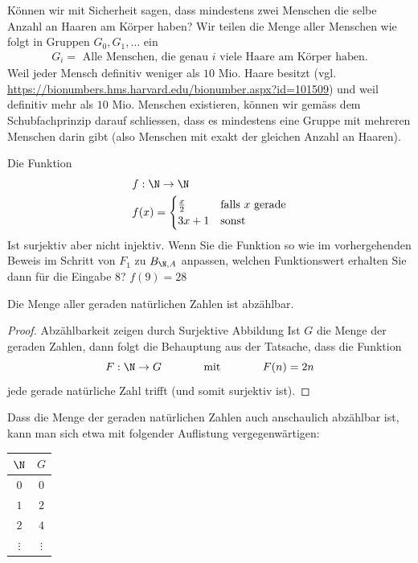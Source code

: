\begin{example}
    Können wir mit Sicherheit sagen, dass mindestens zwei Menschen die selbe Anzahl an Haaren am Körper haben?
    \tcblower
    Wir teilen die Menge aller Menschen wie folgt in Gruppen $G_0,G_1,\dots$ ein
    \begin{align*}
    G_i=\text{ Alle Menschen, die genau $i$ viele Haare am Körper haben.}
    \end{align*}
    Weil jeder Mensch definitiv weniger als $10$ Mio. Haare besitzt (vgl. \url{https://bionumbers.hms.harvard.edu/bionumber.aspx?id=101509}) und weil definitiv mehr als $10$ Mio. Menschen existieren, können wir gemäss dem Schubfachprinzip darauf schliessen, dass es mindestens eine Gruppe mit mehreren Menschen darin gibt (also Menschen mit exakt der gleichen Anzahl an Haaren).
\end{example}

\begin{example}
    Die Funktion
    \begin{align*}
        &f :\N\to\N\\
        &f(x) =
            \begin{cases}
                \frac{x}{2}&\text{falls $x$ gerade}\\
                3x+1&\text{sonst}
            \end{cases}
    \end{align*}
    Ist surjektiv aber nicht injektiv. Wenn Sie die Funktion so wie im vorhergehenden Beweis im Schritt von $F_1$ zu $B_{\N,A}$ anpassen, welchen Funktionswert erhalten Sie dann für die Eingabe $8$?
    \tcblower
    $f(9)=28$
\end{example}


\begin{example}
Die Menge aller geraden natürlichen Zahlen ist abzählbar.
\begin{proof}{Abzählbarkeit zeigen durch Surjektive Abbildung}
Ist $G$ die Menge der geraden Zahlen, dann folgt die Behauptung aus der Tatsache, dass die Funktion
\[
F:\N\to G \phantom{abstand}\text{ mit }\phantom{abstand}F(n)=2n
\]
jede gerade natürliche Zahl trifft (und somit surjektiv ist).
\end{proof}
Dass die Menge der geraden natürlichen Zahlen auch anschaulich abzählbar ist, kann man sich etwa mit folgender Auflistung vergegenwärtigen:
\begin{center}
\begin{tabular}{c|c}
$\N$ & $G$\\
\hline
$0$ & $0$\\
$1$ & $2$\\
$2$ & $4$\\
$\vdots$ & $\vdots$
\end{tabular}
\end{center}
\end{example}

